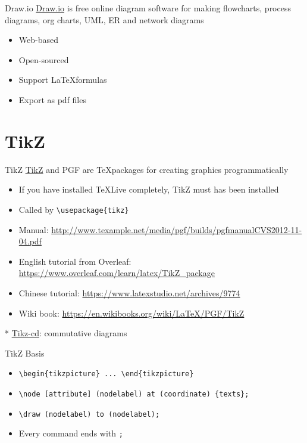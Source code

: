 \documentclass{../TexTemplate/myslide}
\begin{document}
\begin{frame}{Draw.io}
\href{https://www.draw.io/}{Draw.io} is free online diagram software for making flowcharts, process diagrams, org charts, UML, ER and network diagrams
\begin{itemize}
	\item Web-based
	\item Open-sourced
	\item Support \LaTeX formulas
	\item Export as pdf files
\end{itemize}
\end{frame}

\section{TikZ}
\begin{frame}
\sectionpage
\end{frame}

\begin{frame}[fragile]{TikZ}
\href{http://www.texample.net/tikz/}{TikZ} and PGF are \TeX packages for creating graphics programmatically
\begin{itemize}
	\item If you have installed TeXLive completely, TikZ must has been installed
	\item Called by \verb'\usepackage{tikz}'
	\item Manual: \url{http://www.texample.net/media/pgf/builds/pgfmanualCVS2012-11-04.pdf}
	\item English tutorial from Overleaf: \url{https://www.overleaf.com/learn/latex/TikZ_package}
	\item Chinese tutorial: \url{https://www.latexstudio.net/archives/9774}
	\item Wiki book: \url{https://en.wikibooks.org/wiki/LaTeX/PGF/TikZ}
\end{itemize}
* \href{http://ctan.math.washington.edu/tex-archive/graphics/pgf/contrib/tikz-cd/tikz-cd-doc.pdf}{Tikz-cd}: commutative diagrams
\end{frame}

\begin{frame}[fragile]{TikZ Basis}
\begin{itemize}
	\item \verb'\begin{tikzpicture} ... \end{tikzpicture}'
	\item \verb'\node [attribute] (nodelabel) at (coordinate) {texts};'
	\item \verb'\draw (nodelabel) to (nodelabel);'
	\item Every command ends with \verb';'
\end{itemize}
\end{frame}
\end{document}
